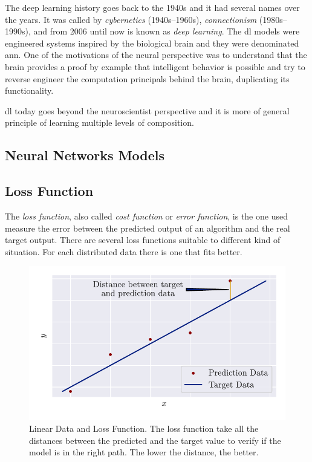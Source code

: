 The deep learning history goes back to the 1940s and it had several names over the years. 
It was called by \emph{cybernetics} (1940s--1960s), \emph{connectionism} (1980s--1990s), and from 2006 until now is known as \emph{deep learning}.
The \gls*{dl} models were engineered systems inspired by the biological brain and they were denominated \gls*{ann}.
One of the motivations of the neural  perspective was to understand that the brain provides a proof by example that intelligent behavior is possible and try to reverse engineer the computation principals behind the brain, duplicating its functionality.

\gls*{dl} today goes beyond the neuroscientist perspective and it is more of general principle of learning multiple levels of composition.

\subsection{Neural Networks Models}

\subsection{Loss Function}

The \emph{loss function}, also called \emph{cost function} or \emph{error function}, is the one used measure the error between the predicted output of an algorithm and the real target output. 
There are several loss functions suitable to different kind of situation. For each distributed data there is one that fits better.

\begin{figure}[!htb]
    \centering
    \includegraphics{figures/2review/nn/mae_chart.pdf}
    \caption[Linear Data and Loss Function]{Linear Data and Loss Function. The loss function take all the distances between the predicted and the target value to verify if the model is in the right path. The lower the distance, the better.}
    \label{fig:mae_chart}
\end{figure}

